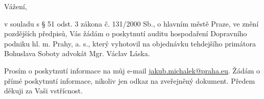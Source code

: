 \documentclass[11pt,a4paper,czech]{article}
\begin{document}

\def \yoursign { }
\def \yourdate { }
\def \oursign {ZK Pha 3/2014}
\def \place {Praha}

\printheader

\subject{Žádost zastupitele hl. m. Prahy o informace}

Vážení,

v souladu s § 51 odst. 3 zákona č. 131/2000 Sb., o hlavním městě Praze, ve znění pozdějších předpisů, Vás žádám o poskytnutí auditu hospodaření Dopravního podniku hl. m. Prahy, a. s., který vyhotovil na objednávku tehdejšího primátora Bohuslava Soboty advokát Mgr. Václav Láska.

Prosím o poskytnutí informace na můj e-mail \url{jakub.michalek@praha.eu}. Žádám o přímé poskytnutí informace, nikoliv jen odkaz na zveřejněný dokument. Předem děkuji za Vaši vstřícnost.

\signature{Mgr. Bc. Jakub Michálek \\ předseda klubu Pirátů \\ zastupitelstvo hl. m. Prahy}

\end{document}
